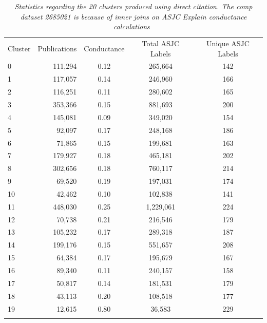 \begin{table}[ht]
\caption{\emph{Statistics regarding the 20 clusters produced using direct citation. The \emph{comp} dataset 
2685021 is because of inner joins on ASJC Explain conductance calculations~\cite{shun_parallel_2016}}}
\label{tab:graclus}       
\begin{tabular}{lrccc}
\hline\noalign{\smallskip}
Cluster & Publications & Conductance & Total ASJC Labels & Unique ASJC Labels\\
\noalign{\smallskip}\hline\noalign{\smallskip}
0 & 111,294 & 0.12 & 265,664 & 142 \\ 
1 & 117,057 & 0.14 & 246,960 & 166 \\ 
2 & 116,251 & 0.11 & 280,602 & 165 \\ 
3 & 353,366 & 0.15 & 881,693 & 200 \\ 
4 & 145,081 & 0.09 & 349,020 & 154 \\ 
5 & 92,097 & 0.17 & 248,168 & 186 \\ 
6 & 71,865 & 0.15 & 199,681 & 163 \\ 
7 & 179,927 & 0.18 & 465,181 & 202 \\ 
8 & 302,656 & 0.18 & 760,117 & 214 \\ 
9 & 69,520 & 0.19 & 197,031 & 174 \\ 
10 & 42,462 & 0.10 & 102,838 & 141 \\ 
11 & 448,030 & 0.25 & 1,229,061 & 224 \\ 
12 & 70,738 & 0.21 & 216,546 & 179 \\ 
13 & 105,232 & 0.17 & 289,318 & 187 \\ 
14 & 199,176 & 0.15 & 551,657 & 208 \\ 
15 & 64,384 & 0.17 & 195,679 & 167 \\ 
16 & 89,340 & 0.11 & 240,157 & 158 \\ 
17 & 50,817 & 0.14 & 181,531 & 179 \\ 
18 & 43,113 & 0.20 & 108,518 & 177 \\ 
19 & 12,615 & 0.80 & 36,583 & 229 \\ \noalign{\smallskip}\hline
\end{tabular}
\end{table}
\newpage



%
%


